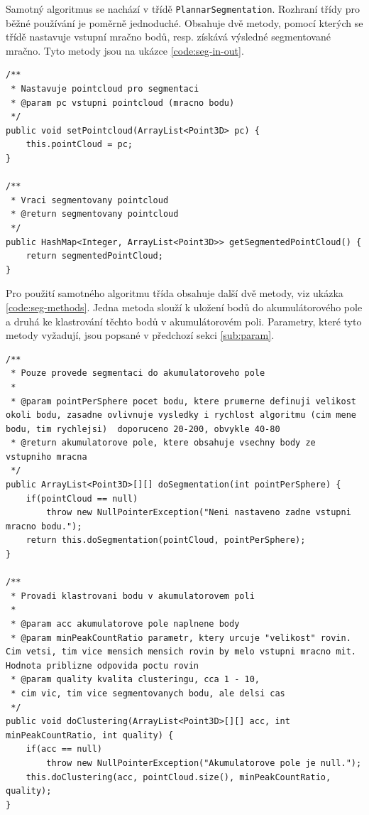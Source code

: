 \documentclass[11pt,twoside,a4paper]{book}
\begin{document}
Samotný algoritmus se nachází v třídě \verb|PlannarSegmentation|. Rozhraní třídy pro běžné používání je poměrně jednoduché. Obsahuje dvě metody, pomocí kterých se třídě nastavuje vstupní mračno bodů, resp. získává výsledné segmentované mračno. Tyto metody jsou na ukázce \ref{code:seg-in-out}.

\begin{lstlisting}[label=code:seg-in-out,caption={Metody pro nastavení vstupu a získání výstup algoritmu.}]
/**
 * Nastavuje pointcloud pro segmentaci
 * @param pc vstupni pointcloud (mracno bodu)
 */
public void setPointcloud(ArrayList<Point3D> pc) {
	this.pointCloud = pc;
}

/**
 * Vraci segmentovany pointcloud
 * @return segmentovany pointcloud
 */
public HashMap<Integer, ArrayList<Point3D>> getSegmentedPointCloud() {
	return segmentedPointCloud;
}
\end{lstlisting}

Pro použití samotného algoritmu třída obsahuje další dvě metody, viz ukázka \ref{code:seg-methods}. Jedna metoda slouží k uložení bodů do akumulátorového pole a druhá ke klastrování těchto bodů v akumulátorovém poli. Parametry, které tyto metody vyžadují, jsou popsané v předchozí sekci \ref{sub:param}.

\begin{lstlisting}[label={code:seg-methods},caption={Metody určené pro používání algoritmu.}]
/**
 * Pouze provede segmentaci do akumulatoroveho pole
 * 
 * @param pointPerSphere pocet bodu, ktere prumerne definuji velikost okoli bodu, zasadne ovlivnuje vysledky i rychlost algoritmu (cim mene bodu, tim rychlejsi)  doporuceno 20-200, obvykle 40-80
 * @return akumulatorove pole, ktere obsahuje vsechny body ze vstupniho mracna
 */
public ArrayList<Point3D>[][] doSegmentation(int pointPerSphere) {
	if(pointCloud == null)
	    throw new NullPointerException("Neni nastaveno zadne vstupni mracno bodu.");
	return this.doSegmentation(pointCloud, pointPerSphere);
}

/**
 * Provadi klastrovani bodu v akumulatorovem poli
 * 
 * @param acc akumulatorove pole naplnene body
 * @param minPeakCountRatio parametr, ktery urcuje "velikost" rovin. Cim vetsi, tim vice mensich mensich rovin by melo vstupni mracno mit. Hodnota priblizne odpovida poctu rovin
 * @param quality kvalita clusteringu, cca 1 - 10,
 * cim vic, tim vice segmentovanych bodu, ale delsi cas
 */
public void doClustering(ArrayList<Point3D>[][] acc, int minPeakCountRatio, int quality) {
	if(acc == null)
	    throw new NullPointerException("Akumulatorove pole je null.");
	this.doClustering(acc, pointCloud.size(), minPeakCountRatio, quality);
}
\end{lstlisting}
\end{document}

